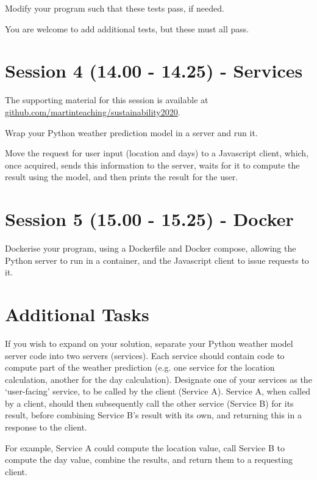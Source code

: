 \documentclass{article}
\begin{document}
Modify your program such that these tests pass, if needed.

You are welcome to add additional tests, but these must all pass.

\section{Session 4 (14.00 - 14.25) - Services}

The supporting material for this session is available at
\href{https://github.com/martinteaching/sustainability2020}{github.com/martinteaching/sustainability2020}.

Wrap your Python weather prediction model in a server and run it.

Move the request for user input (location and days) to a Javascript
client, which, once acquired, sends this information to the server,
waits for it to compute the result using the model, and then prints the
result for the user.

\section{Session 5 (15.00 - 15.25) - Docker}

Dockerise your program, using a Dockerfile and Docker compose, allowing
the Python server to run in a container, and the Javascript client to
issue requests to it.

\section{Additional Tasks}

If you wish to expand on your solution, separate your Python weather model
server code into two servers (services). Each service should contain
code to compute part of the weather prediction (e.g. one service for
the location calculation, another for the day calculation). Designate
one of your services as the `user-facing' service, to be called by
the client (Service A). Service A, when called by a client, should
then subsequently call the other service (Service B) for its result,
before combining Service B's result with its own, and returning this in
a response to the client.

For example, Service A could compute the location value, call Service
B to compute the day value, combine the results, and return them to a
requesting client.
\end{document}
